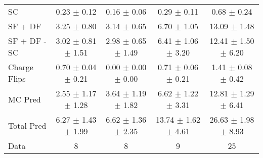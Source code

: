 \begin{tabular}{l|cccc}
                                 SC &  0.23 $\pm$  0.12 &  0.16 $\pm$  0.06 &  0.29 $\pm$  0.11 &  0.68 $\pm$  0.24 \\
                            SF + DF &  3.25 $\pm$  0.80 &  3.14 $\pm$  0.65 &  6.70 $\pm$  1.05 & 13.09 $\pm$  1.48 \\
\hline
                       SF + DF - SC &  3.02 $\pm$  0.81 $\pm$  1.51 &  2.98 $\pm$  0.65 $\pm$  1.49 &  6.41 $\pm$  1.06 $\pm$  3.20 & 12.41 $\pm$  1.50 $\pm$  6.20 \\
\hline\hline
                       Charge Flips &  0.70 $\pm$  0.04 $\pm$  0.21 &  0.00 $\pm$  0.00 $\pm$  0.00 &  0.71 $\pm$  0.06 $\pm$  0.21 &  1.41 $\pm$  0.08 $\pm$  0.42 \\
\hline
                            MC Pred &  2.55 $\pm$  1.17 $\pm$  1.28 &  3.64 $\pm$  1.19 $\pm$  1.82 &  6.62 $\pm$  1.22 $\pm$  3.31 & 12.81 $\pm$  1.29 $\pm$  6.41 \\
\hline
                         Total Pred &  6.27 $\pm$  1.43 $\pm$  1.99 &  6.62 $\pm$  1.36 $\pm$  2.35 & 13.74 $\pm$  1.62 $\pm$  4.61 & 26.63 $\pm$  1.98 $\pm$  8.93 \\
\hline\hline
                               Data &     8 &     8 &     9 &    25 \\
\hline\hline
\end{tabular}

